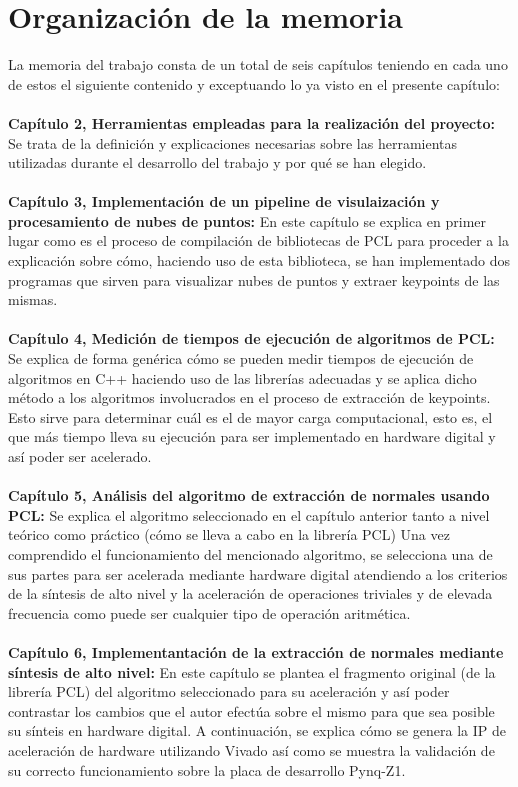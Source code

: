 \section{Organización de la memoria}
La memoria del trabajo consta de un total de seis capítulos teniendo en cada uno de estos el siguiente contenido y exceptuando lo ya visto en el presente capítulo:
\\
\\
\textbf{Capítulo 2, Herramientas empleadas para la realización del proyecto:} Se trata de la definición y explicaciones necesarias sobre las herramientas utilizadas durante el desarrollo del trabajo y por qué se han elegido.
\\
\\
\textbf{Capítulo 3, Implementación de un pipeline de visulaización y procesamiento de nubes de puntos:} En este capítulo se explica en primer lugar como es el proceso de compilación de bibliotecas de PCL para proceder a la explicación sobre cómo, haciendo uso de esta biblioteca, se han implementado dos programas que sirven para visualizar nubes de puntos y extraer keypoints de las mismas.
\\
\\
\textbf{Capítulo 4, Medición de tiempos de ejecución de algoritmos de PCL:} Se explica de forma genérica cómo se pueden medir tiempos de ejecución de algoritmos en C++ haciendo uso de las librerías adecuadas  y se aplica dicho método a los algoritmos involucrados en el proceso de extracción de keypoints. Esto sirve para determinar cuál es el de mayor carga computacional, esto es, el que más tiempo lleva su ejecución para ser implementado en hardware digital y así poder ser acelerado.
\\
\\
\textbf{Capítulo 5, Análisis del algoritmo de extracción de normales usando PCL:} Se explica el algoritmo seleccionado en el capítulo anterior tanto a nivel teórico como práctico (cómo se lleva a cabo en la librería PCL) Una vez comprendido el funcionamiento del mencionado algoritmo, se selecciona una de sus partes para ser acelerada mediante hardware digital atendiendo a los criterios de la síntesis de alto nivel y la aceleración de operaciones triviales y de elevada frecuencia como puede ser cualquier tipo de operación aritmética.
\\
\\
\textbf{Capítulo 6, Implementantación de la extracción de normales mediante síntesis de alto nivel:} En este capítulo se plantea el fragmento original (de la librería PCL) del algoritmo seleccionado para su aceleración y así poder contrastar los cambios que el autor efectúa sobre el mismo para que sea posible su sínteis en hardware digital. A continuación, se explica cómo se genera la IP de aceleración de hardware utilizando Vivado así como se muestra la validación de su correcto funcionamiento sobre la placa de desarrollo Pynq-Z1.


